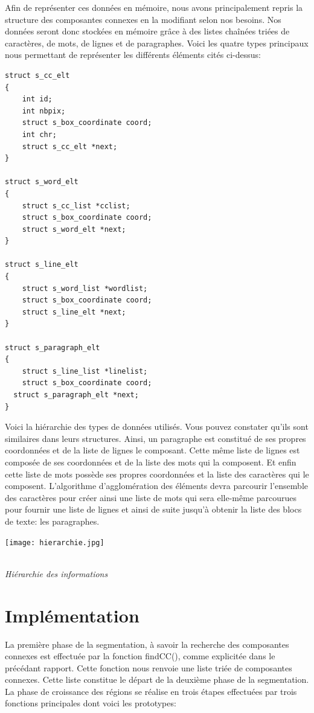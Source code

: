 \documentclass[a4paper,12pt]{report}
\begin{document}
Afin de représenter ces données en mémoire, nous avons principalement repris la
structure des composantes connexes en la modifiant selon nos besoins. Nos données seront
donc stockées en mémoire grâce à des listes chaînées triées de caractères, de mots, de
lignes et de paragraphes. Voici les quatre types principaux nous permettant de représenter
les différents éléments cités ci-dessus:

\begin{lstlisting}
struct s_cc_elt
{
    int id;
    int nbpix;
    struct s_box_coordinate coord;
    int chr;
    struct s_cc_elt *next;
}

struct s_word_elt
{
    struct s_cc_list *cclist;
    struct s_box_coordinate coord;
    struct s_word_elt *next;
}

struct s_line_elt
{
    struct s_word_list *wordlist;
    struct s_box_coordinate coord;
    struct s_line_elt *next;
}

struct s_paragraph_elt
{
    struct s_line_list *linelist;
    struct s_box_coordinate coord;
  struct s_paragraph_elt *next;
}
\end{lstlisting}


Voici la hiérarchie des types de données utilisés. Vous pouvez constater qu'ils sont
similaires dans leurs structures. Ainsi, un paragraphe est constitué de ses propres
coordonnées et de la liste de lignes le composant. Cette même liste de lignes est composée
de ses coordonnées et de la liste des mots qui la composent. Et enfin cette liste de mots
possède ses propres coordonnées et la liste des caractères qui le composent. L'algorithme 
d'agglomération des éléments devra parcourir l'ensemble des caractères pour
créer ainsi une liste de mots qui sera elle-même parcourues pour fournir une liste de lignes
et ainsi de suite jusqu'à obtenir la liste des blocs de texte: les paragraphes.

\begin{center}
  \texttt{[image: hierarchie.jpg]}
  \caption{\\\emph{Hi\'erarchie des informations}}
\end{center}



\section{Impl\'ementation}

La première phase de la segmentation, à savoir la recherche des composantes connexes
est effectuée par la fonction findCC(), comme explicitée dans le précédant rapport. Cette
fonction nous renvoie une liste triée de composantes connexes. Cette liste constitue le
départ de la deuxième phase de la segmentation. La phase de croissance des régions se
réalise en trois étapes effectuées par trois fonctions principales dont voici les prototypes:
\end{document}
